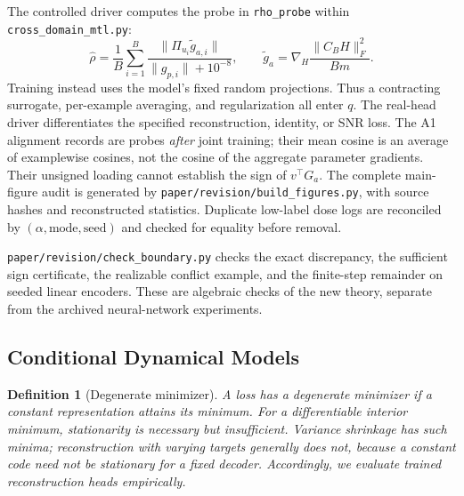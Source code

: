 \documentclass{article}
\newtheorem{definition}{Definition}
\begin{document}
The controlled driver computes the probe in \texttt{rho\_probe} within
\texttt{cross\_domain\_mtl.py}:
\begin{equation}
 \hat\rho=\frac1B\sum_{i=1}^B
 \frac{\|\Pi_{u_i}\widetilde g_{a,i}\|}{\|g_{p,i}\|+10^{-8}},
 \qquad \widetilde g_a=\nabla_H\frac{\|C_BH\|_F^2}{Bm}.
\end{equation}
Training instead uses the model's fixed random projections. Thus a contracting
surrogate, per-example averaging, and regularization all enter $q$.
The real-head driver differentiates the specified reconstruction, identity,
or SNR loss. The A1 alignment records are probes \emph{after} joint training;
their mean cosine is an average of examplewise cosines, not the cosine of the
aggregate parameter gradients. Their unsigned loading cannot establish the
sign of $v^\top G_a$. The complete main-figure audit is generated by
\texttt{paper/revision/build\_figures.py}, with source hashes and reconstructed
statistics. Duplicate low-label dose logs are reconciled by
$(\alpha,\mathrm{mode},\mathrm{seed})$ and checked for equality before removal.

\texttt{paper/revision/check\_boundary.py} checks the exact discrepancy,
the sufficient sign certificate, the realizable conflict example, and
the finite-step remainder on seeded linear encoders. These are algebraic
checks of the new theory, separate from the archived neural-network experiments.

\subsection{Conditional Dynamical Models}

\begin{definition}[Degenerate minimizer]\label{def:degmin}
A loss has a degenerate minimizer if a constant representation attains its minimum. For a differentiable interior minimum, stationarity is necessary but insufficient. Variance shrinkage has such minima; reconstruction with varying targets generally does not, because a constant code need not be stationary for a fixed decoder. Accordingly, we evaluate trained reconstruction heads empirically.
\end{definition}
\end{document}
